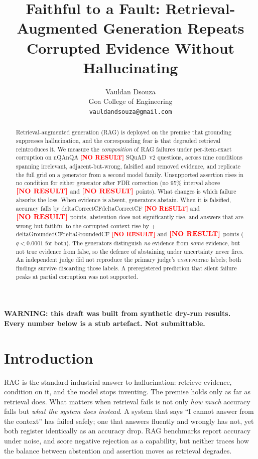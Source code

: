 \documentclass[11pt]{article}
\title{Faithful to a Fault: Retrieval-Augmented Generation Repeats\\
Corrupted Evidence Without Hallucinating}
\author{
  Vauldan Dsouza \\
  Goa College of Engineering \\
  \texttt{vauldandsouza@gmail.com}
}
\newcommand{\NUM}[1]{%
  \ifcsname #1\endcsname\csname #1\endcsname\else
  \textcolor{red}{\textbf{[NO RESULT]}}\fi}
\begin{document}
\maketitle

\ifdefined\SYNTHETICRESULTS
\begin{center}\colorbox{red!20}{\parbox{0.9\linewidth}{\centering\bfseries
WARNING: this draft was built from synthetic dry-run results.\\
Every number below is a stub artefact. Not submittable.}}\end{center}
\fi

\begin{abstract}
Retrieval-augmented generation (RAG) is deployed on the premise that grounding
suppresses hallucination, and the corresponding fear is that degraded retrieval
reintroduces it. We measure the \emph{composition} of RAG failures under
per-item-exact corruption on \NUM{nQA} SQuAD~v2 questions, across nine conditions
spanning irrelevant, adjacent-but-wrong, falsified and removed evidence, and
replicate the full grid on a generator from a second model family. Unsupported
assertion rises in no condition for either generator after FDR correction (no 95\%
interval above \(\NUM{halluMaxUpper}\) and \(\NUM{halluMaxUpperTwo}\) points). What
changes is which failure absorbs the loss. When evidence is absent, generators
abstain. When it is falsified, accuracy falls by \NUM{deltaCorrectCF} and
\(\NUM{cfDeltaCorrectTwo}\) points, abstention does not significantly rise, and
answers that are wrong but faithful to the corrupted context rise by
\(+\)\NUM{deltaGroundedCF} and \(\NUM{cfDeltaGroundedTwo}\) points
(\(q < 0.0001\) for both). The generators distinguish \emph{no} evidence from
\emph{some} evidence, but not true evidence from false, so the defence of abstaining
under uncertainty never fires. An independent judge did not reproduce the primary
judge's \textsc{unsupported} labels; both findings survive discarding those labels. A
preregistered prediction that silent failure peaks at partial corruption was not
supported.
\end{abstract}

\section{Introduction}
RAG \citep{lewis2020rag} is the standard industrial answer to hallucination: retrieve
evidence, condition on it, and the model stops inventing. The premise holds only as
far as retrieval does. What matters when retrieval fails is not only \emph{how much}
accuracy falls but \emph{what the system does instead}. A system that says ``I cannot
answer from the context'' has failed safely; one that answers fluently and wrongly
has not, yet both register identically as an accuracy drop. RAG benchmarks
\citep{chen2024rgb,cuconasu2024noise} report accuracy under noise, and
\citet{chen2024rgb} score negative rejection as a capability, but neither traces how
the balance between abstention and assertion moves as retrieval degrades.
\end{document}
